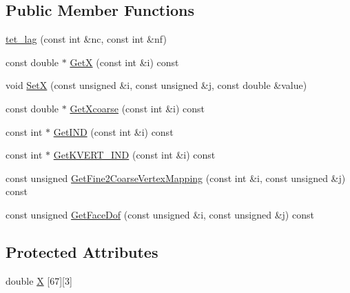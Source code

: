 \subsection*{Public Member Functions}
\begin{DoxyCompactItemize}
\item 
\mbox{\hyperlink{classfemus_1_1tet__lag_a32cf3eee91dfe9c26539af6741a66078}{tet\+\_\+lag}} (const int \&nc, const int \&nf)
\item 
const double $\ast$ \mbox{\hyperlink{classfemus_1_1tet__lag_a9dd1283cbaae6b1203ec9b4082267fb2}{GetX}} (const int \&i) const
\item 
void \mbox{\hyperlink{classfemus_1_1tet__lag_a776f9fdab9de50b036cc3f30abe85d35}{SetX}} (const unsigned \&i, const unsigned \&j, const double \&value)
\item 
const double $\ast$ \mbox{\hyperlink{classfemus_1_1tet__lag_a7abd03724f2fbcd92829a2c56fb1c49d}{Get\+Xcoarse}} (const int \&i) const
\item 
const int $\ast$ \mbox{\hyperlink{classfemus_1_1tet__lag_ad7c531de0360446b1ef3abc2e8c76229}{Get\+I\+ND}} (const int \&i) const
\item 
const int $\ast$ \mbox{\hyperlink{classfemus_1_1tet__lag_a6fe6b8ef67dd6799487fc1acff5b36de}{Get\+K\+V\+E\+R\+T\+\_\+\+I\+ND}} (const int \&i) const
\item 
const unsigned \mbox{\hyperlink{classfemus_1_1tet__lag_a92607e302e1bf2526b2750295950f116}{Get\+Fine2\+Coarse\+Vertex\+Mapping}} (const int \&i, const unsigned \&j) const
\item 
const unsigned \mbox{\hyperlink{classfemus_1_1tet__lag_a1d112ec062067cef9672bd1a3e726a5e}{Get\+Face\+Dof}} (const unsigned \&i, const unsigned \&j) const
\end{DoxyCompactItemize}
\subsection*{Protected Attributes}
\begin{DoxyCompactItemize}
\item 
double \mbox{\hyperlink{classfemus_1_1tet__lag_a0b90cc9662627c8291da4c897ed80e2d}{X}} \mbox{[}67\mbox{]}\mbox{[}3\mbox{]}
\end{DoxyCompactItemize}
